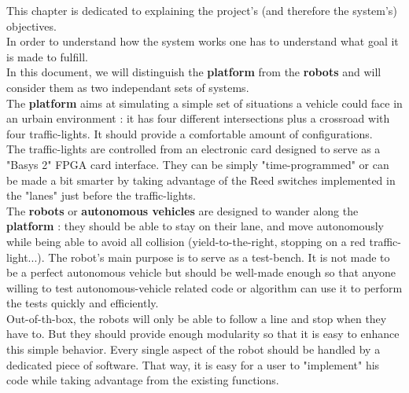 This chapter is dedicated to explaining the project's (and therefore the system's) objectives.\\
In order to understand how the system works one has to understand what goal it is made to fulfill.\\

In this document, we will distinguish the \textbf{platform} from the \textbf{robots} and will consider them as two independant sets of systems.\\

The \textbf{platform} aims at simulating a simple set of situations a vehicle could face in an urbain environment : it has four different intersections plus a crossroad with four traffic-lights. It should provide a comfortable amount of configurations.\\
The traffic-lights are controlled from an electronic card designed to serve as a "Basys 2" FPGA card interface. They can be simply "time-programmed" or can be made a bit smarter by taking advantage of the Reed switches implemented in the "lanes" just before the traffic-lights.\\

The \textbf{robots} or \textbf{autonomous vehicles} are designed to wander along the \textbf{platform} : they should be able to stay on their lane, and move autonomously while being able to avoid all collision (yield-to-the-right, stopping on a red traffic-light...). The robot's main purpose is to serve as a test-bench. It is not made to be a perfect autonomous vehicle but should be well-made enough so that anyone willing to test autonomous-vehicle related code or algorithm can use it to perform the tests quickly and efficiently.\\
Out-of-th-box, the robots will only be able to follow a line and stop when they have to. But they should provide enough modularity so that it is easy to enhance this simple behavior. Every single aspect of the robot should be handled by a dedicated piece of software. That way, it is easy for a user to "implement" his code while taking advantage from the existing functions.